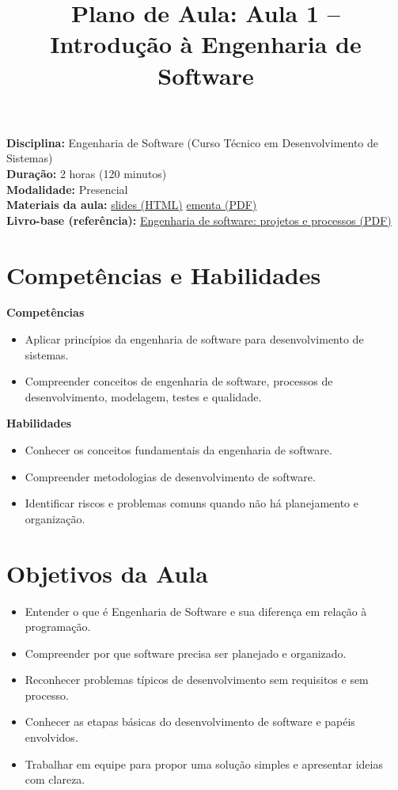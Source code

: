 \documentclass[12pt,a4paper]{article}
\title{Plano de Aula: Aula 1 -- Introdução à Engenharia de Software}
\date{}
\begin{document}
\maketitle

\noindent
\textbf{Disciplina:} Engenharia de Software (Curso Técnico em Desenvolvimento de Sistemas)\\
\textbf{Duração:} 2 horas (120 minutos)\\
\textbf{Modalidade:} Presencial\\
\textbf{Materiais da aula:} \href{aula-01.html}{slides (HTML)} \quad \href{aula-01.pdf}{ementa (PDF)}\\
\textbf{Livro-base (referência):} \href{../99-Materiais/Engenharia%20de%20software%20projetos%20e%20processos%20by%20Wilson%20de%20P%C3%A1dua%20Paula%20Filho%20.epub.pdf}{Engenharia de software: projetos e processos (PDF)}

\section{Competências e Habilidades}
\textbf{Competências}
\begin{itemize}[leftmargin=*,itemsep=0.25em]
  \item Aplicar princípios da engenharia de software para desenvolvimento de sistemas.
  \item Compreender conceitos de engenharia de software, processos de desenvolvimento, modelagem, testes e qualidade.
\end{itemize}

\textbf{Habilidades}
\begin{itemize}[leftmargin=*,itemsep=0.25em]
  \item Conhecer os conceitos fundamentais da engenharia de software.
  \item Compreender metodologias de desenvolvimento de software.
  \item Identificar riscos e problemas comuns quando não há planejamento e organização.
\end{itemize}

\section{Objetivos da Aula}
\begin{itemize}[leftmargin=*,itemsep=0.25em]
  \item Entender o que é Engenharia de Software e sua diferença em relação à programação.
  \item Compreender por que software precisa ser planejado e organizado.
  \item Reconhecer problemas típicos de desenvolvimento sem requisitos e sem processo.
  \item Conhecer as etapas básicas do desenvolvimento de software e papéis envolvidos.
  \item Trabalhar em equipe para propor uma solução simples e apresentar ideias com clareza.
\end{itemize}
\end{document}
